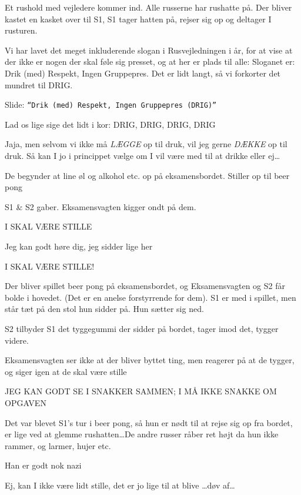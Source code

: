 \documentclass[a4paper,11pt]{article}
\begin{document}
\begin{sketch}
\scene Et rushold med vejledere kommer ind. Alle russerne har rushatte på.
Der bliver kastet en kasket over til S1, S1 tager hatten på, rejser sig op og deltager I rusturen.

 Vi har lavet det meget inkluderende slogan i Rusvejledningen i år, for at vise at der ikke er nogen der skal føle sig presset, og at her er plads til alle: Sloganet er: Drik (med) Respekt, Ingen Gruppepres. Det er lidt langt, så vi forkorter det mundret til DRIG.

 Slide: \texttt{``Drik (med) Respekt, Ingen Gruppepres (DRIG)''}

 Lad os lige sige det lidt i kor: DRIG, DRIG, DRIG, DRIG

 Jaja, men selvom vi ikke må \emph{LÆGGE} op til druk, vil jeg gerne \emph{DÆKKE} op til druk. Så kan I jo i princippet vælge om I vil være med til at drikke eller ej\ldots

\scene De begynder at line øl og alkohol etc. op på eksamensbordet. Stiller op til beer pong

\scene S1 \& S2 gaber. Eksamensvagten kigger ondt på dem.

 I SKAL VÆRE STILLE

 Jeg kan godt høre dig, jeg sidder lige her

 I SKAL VÆRE STILLE!

\scene Der bliver spillet beer pong på eksamensbordet, og Eksamensvagten og S2 får bolde i hovedet. (Det er en anelse forstyrrende for dem). S1 er med i spillet, men står tæt på den stol hun sidder på. Hun sætter sig ned.


\scene S2 tilbyder S1 det tyggegummi der sidder på bordet, tager imod det, tygger videre.

\scene Eksamensvagten ser ikke at der bliver byttet ting, men reagerer på at de tygger, og siger igen at de skal være stille

 JEG KAN GODT SE I SNAKKER SAMMEN; I MÅ IKKE SNAKKE OM OPGAVEN

\scene Det var blevet S1's tur i beer pong, så hun er nødt til at rejse sig op fra bordet, er lige ved at glemme rushatten\ldots De andre russer råber ret højt da hun ikke rammer, og larmer, hujer etc.

 Han er godt nok nazi 

 Ej, kan I ikke være lidt stille, det er jo lige til at blive \ldots  døv af\ldots {}


\end{sketch}
\end{document}
